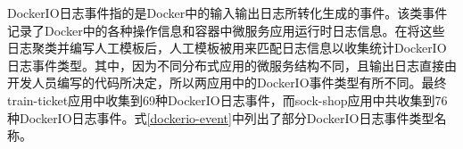 DockerIO日志事件指的是Docker中的输入输出日志所转化生成的事件。该类事件记录了Docker\cite{boettiger2015introduction}中的各种操作信息和容器中微服务应用运行时日志信息。在将这些日志聚类并编写人工模板后，人工模板被用来匹配日志信息以收集统计DockerIO日志事件类型。其中，因为不同分布式应用的微服务结构不同，且输出日志直接由开发人员编写的代码所决定，所以两应用中的DockerIO事件类型有所不同。最终train-ticket应用中收集到69种DockerIO日志事件，而sock-shop应用中共收集到76种DockerIO日志事件。式\ref{dockerio-event}中列出了部分DockerIO日志事件类型名称。

